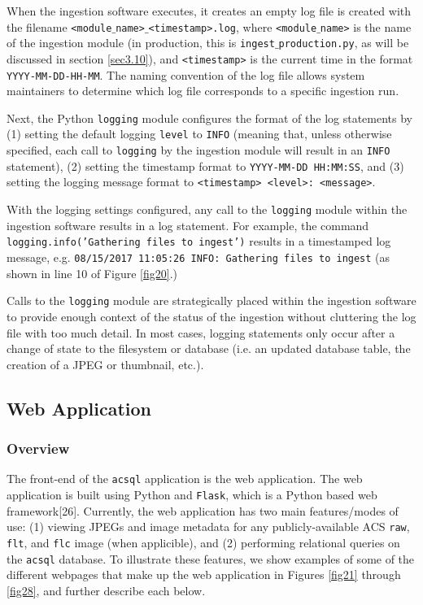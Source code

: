 \documentclass[10pt,journal,compsoc]{IEEEtran}
\begin{document}
When the ingestion software executes, it creates an empty log file is created with the filename \texttt{<module$\_$name>$\_$<timestamp>.log}, where \texttt{<module$\_$name>} is the name of the
ingestion module (in production, this is \texttt{ingest$\_$production.py}, as will be discussed in section \ref{sec3.10}), and \texttt{<timestamp>} is the current time in the format
\texttt{YYYY-MM-DD-HH-MM}. The naming convention of the log file allows system maintainers to determine which log file corresponds to a specific ingestion run.

Next, the Python \texttt{logging} module configures the format of the log statements by (1) setting the default logging \texttt{level} to \texttt{INFO} (meaning
that, unless otherwise specified, each call to \texttt{logging} by the ingestion module will result in an \texttt{INFO} statement), (2) setting the timestamp format to
\texttt{YYYY-MM-DD HH:MM:SS}, and (3) setting the logging message format to \texttt{<timestamp> <level>: <message>}.

With the logging settings configured, any call to the \texttt{logging} module within the ingestion software results in a log statement.  For example, the command
\texttt{logging.info('Gathering files to ingest')} results in a timestamped log message, e.g. \texttt{08/15/2017 11:05:26 INFO: Gathering files to ingest} (as shown in line 10 of Figure \ref{fig20}.)

Calls to the \texttt{logging} module are strategically placed within the ingestion software to provide enough context of the status of the ingestion without cluttering the log file with
too much detail. In most cases, logging statements only occur after a change of state to the filesystem or database (i.e. an updated database table, the creation of a JPEG or thumbnail, etc.).


\subsection{Web Application} \label{sec3.9}


\subsubsection{Overview}

The front-end of the \texttt{acsql} application is the web application.  The web application is built using Python and \texttt{Flask}, which is a Python based web framework[26].
Currently, the web application has two main features/modes of use: (1) viewing JPEGs and image metadata for any publicly-available ACS \texttt{raw}, \texttt{flt}, and \texttt{flc} image
(when applicible), and (2) performing relational queries on the \texttt{acsql} database.  To illustrate these features, we show examples of some of the different webpages that make up the
web application in Figures \ref{fig21} through \ref{fig28}, and further describe each below.
\end{document}
